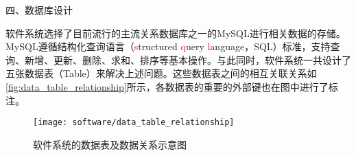 四、数据库设计



软件系统选择了目前流行的主流关系数据库之一的MySQL进行相关数据的存储\cite{mysql}。MySQL遵循结构化查询语言（\textcolor{red}{s}tructured \textcolor{red}{q}uery \textcolor{red}{l}anguage，SQL）标准，支持查询、新增、更新、删除、求和、排序等基本操作。与此同时，软件系统一共设计了五张数据表（Table）来解决上述问题。这些数据表之间的相互关联关系如\autoref{fig:data_table_relationship}所示，各数据表的重要的外部键也在图中进行了标注。
\begin{figure}[htbp]
    \centering
    \texttt{[image: software/data\_table\_relationship]}
    \caption{\label{fig:data_table_relationship}软件系统的数据表及数据关系示意图}
\end{figure}

